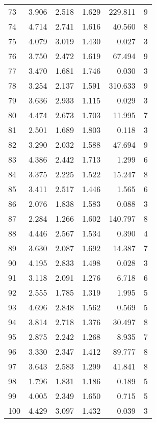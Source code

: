 \begin{tabular}{lrrrrr}
73  &     3.906 &      2.518 &      1.629 &  229.811 &        9 \\
74  &     4.714 &      2.741 &      1.616 &   40.560 &        8 \\
75  &     4.079 &      3.019 &      1.430 &    0.027 &        3 \\
76  &     3.750 &      2.472 &      1.619 &   67.494 &        9 \\
77  &     3.470 &      1.681 &      1.746 &    0.030 &        3 \\
78  &     3.254 &      2.137 &      1.591 &  310.633 &        9 \\
79  &     3.636 &      2.933 &      1.115 &    0.029 &        3 \\
80  &     4.474 &      2.673 &      1.703 &   11.995 &        7 \\
81  &     2.501 &      1.689 &      1.803 &    0.118 &        3 \\
82  &     3.290 &      2.032 &      1.588 &   47.694 &        9 \\
83  &     4.386 &      2.442 &      1.713 &    1.299 &        6 \\
84  &     3.375 &      2.225 &      1.522 &   15.247 &        8 \\
85  &     3.411 &      2.517 &      1.446 &    1.565 &        6 \\
86  &     2.076 &      1.838 &      1.583 &    0.088 &        3 \\
87  &     2.284 &      1.266 &      1.602 &  140.797 &        8 \\
88  &     4.446 &      2.567 &      1.534 &    0.390 &        4 \\
89  &     3.630 &      2.087 &      1.692 &   14.387 &        7 \\
90  &     4.195 &      2.833 &      1.498 &    0.028 &        3 \\
91  &     3.118 &      2.091 &      1.276 &    6.718 &        6 \\
92  &     2.555 &      1.785 &      1.319 &    1.995 &        5 \\
93  &     4.696 &      2.848 &      1.562 &    0.569 &        5 \\
94  &     3.814 &      2.718 &      1.376 &   30.497 &        8 \\
95  &     2.875 &      2.242 &      1.268 &    8.935 &        7 \\
96  &     3.330 &      2.347 &      1.412 &   89.777 &        8 \\
97  &     3.643 &      2.583 &      1.299 &   41.841 &        8 \\
98  &     1.796 &      1.831 &      1.186 &    0.189 &        5 \\
99  &     4.005 &      2.349 &      1.650 &    0.715 &        5 \\
100 &     4.429 &      3.097 &      1.432 &    0.039 &        3 \\
\bottomrule
\end{tabular}
